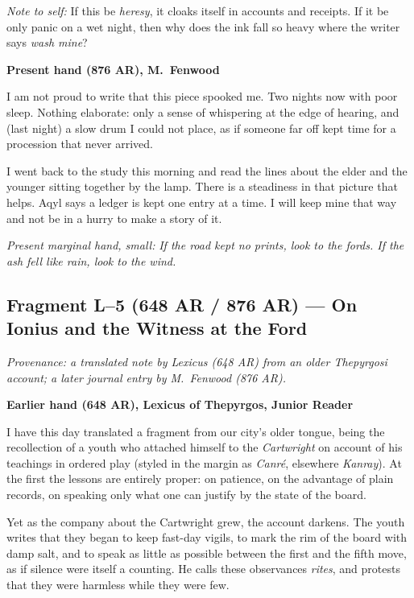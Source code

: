 \documentclass[11pt]{article}
\begin{document}
\medskip
\noindent\textit{Note to self:} If this be \emph{heresy}, it cloaks itself in accounts and receipts. If it be only panic on a wet night, then why does the ink fall so heavy where the writer says \emph{wash mine}?

\medskip
\noindent\textbf{Present hand (876 AR), M.\ Fenwood}

I am not proud to write that this piece spooked me. Two nights now with poor sleep. Nothing elaborate: only a sense of whispering at the edge of hearing, and (last night) a slow drum I could not place, as if someone far off kept time for a procession that never arrived.

I went back to the study this morning and read the lines about the elder and the younger sitting together by the lamp. There is a steadiness in that picture that helps. Aqyl says a ledger is kept one entry at a time. I will keep mine that way and not be in a hurry to make a story of it.

\medskip
\noindent\textit{Present marginal hand, small:} \emph{If the road kept no prints, look to the fords. If the ash fell like rain, look to the wind.}

\subsection{Fragment L--5 (648 AR / 876 AR) --- On Ionius and the Witness at the Ford}
\label{frag:l5}
{}

\noindent\textit{Provenance: a translated note by Lexicus (648 AR) from an older Thepyrgosi account; a later journal entry by M.\ Fenwood (876 AR).}

\medskip
\noindent\textbf{Earlier hand (648 AR), Lexicus of Thepyrgos, Junior Reader}

I have this day translated a fragment from our city’s older tongue, being the recollection of a youth who attached himself to the \textit{Cartwright} on account of his teachings in ordered play (styled in the margin as \textit{Canr\'e}, elsewhere \textit{Kanray}). At the first the lessons are entirely proper: on patience, on the advantage of plain records, on speaking only what one can justify by the state of the board. 

Yet as the company about the Cartwright grew, the account darkens. The youth writes that they began to keep fast-day vigils, to mark the rim of the board with damp salt, and to speak as little as possible between the first and the fifth move, as if silence were itself a counting. He calls these observances \textit{rites}, and protests that they were harmless while they were few.
\end{document}
